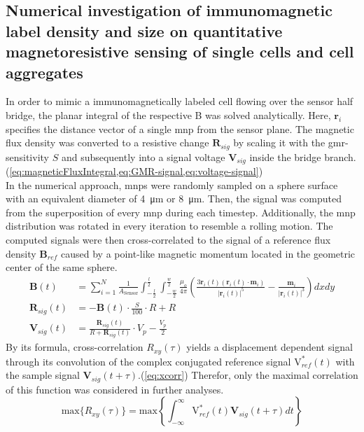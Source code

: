 \subsection{Numerical investigation of immunomagnetic label density and size on quantitative magnetoresistive sensing of single cells and cell aggregates}
In order to mimic a immunomagnetically labeled cell flowing over the sensor half bridge, the planar integral of the respective \acrfull{B} was solved analytically. Here, $\mathbf{r}_i$ specifies the distance vector of a single \gls{mnp} from the sensor plane. The magnetic flux density was converted to a resistive change $\mathbf{R}_{sig}$ by scaling it with the \gls{gmr}-sensitivity $S$ and subsequently into a signal voltage $\mathbf{V}_{sig}$ inside the bridge branch.(\cref{eq:magneticFluxIntegral,eq:GMR-signal,eq:voltage-signal})\\
In the numerical approach, \glspl{mnp} were randomly sampled on a sphere surface with an equivalent diameter of \SI{4}{\micro\meter} or \SI{8}{\micro\meter}. Then, the signal was computed from the superposition of every \gls{mnp} during each timestep. Additionally, the \gls{mnp} distribution was rotated in every iteration to resemble a rolling motion. The computed signals were then cross-correlated to the signal of a reference flux density $\mathbf{B}_{ref}$ caused by a point-like magnetic momentum located in the geometric center of the same sphere.
\begin{align}
	\mathbf{B}(t) &= \sum_{i=1}^{N} \frac{1}{A_{\mathrm{Sensor}}} \int_{-\frac{l}{2}}^{\frac{l}{2}} \int_{-\frac{w}{2}}^{\frac{w}{2}} \frac{\mu_{o}}{4 \pi}\left(\frac{3 \mathbf{r}_{i}(t)\left(\mathbf{r}_{i}(t) \cdot \mathbf{m}_{i}\right)}{\left|\mathbf{r}_{i}(t)\right|^{5}}-\frac{\mathbf{m}_{i}}{\left|\mathbf{r}_{i}(t)\right|^{3}}\right) dx dy \label{eq:magneticFluxIntegral} \\
	\mathbf{R}_{sig}(t) &= - \mathbf{B}(t) \cdot \frac{S}{100} \cdot R + R \label{eq:GMR-signal}\\
	\mathbf{V}_{sig}(t) &= \frac{\mathbf{R}_{sig}(t)}{R + \mathbf{R}_{sig}(t)}\cdot V_p - \frac{V_p}{2} \label{eq:voltage-signal}
\end{align}
By its formula, cross-correlation $R_{x y}(\tau)$ yields a displacement dependent signal through its convolution of the complex conjugated reference signal $\mathrm{V}_{ref}^{*}(t)$ with the sample signal $\mathbf{V}_{sig}(t+\tau)$.(\cref{eq:xcorr}) Therefor, only the maximal correlation of this function was considered in further analyses.
\begin{equation}
	\mathrm{max}\{R_{x y}(\tau)\}=\mathrm{max}\left\{\int_{-\infty}^{\infty} \mathrm{V}_{ref}^{*}(t) \mathbf{V}_{sig}(t+\tau) dt \right\} \label{eq:xcorr}
\end{equation}


